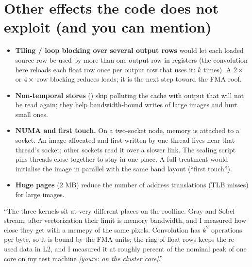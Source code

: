 \section{Other effects the code does not exploit (and you can mention)}

\begin{itemize}
\item \textbf{Tiling / loop blocking over several output rows} would let each loaded source row be used by more than one output row in registers (the convolution here reloads each float row once per output row that uses it: $k$ times). A $2\times$ or $4\times$ row blocking reduces loads; it is the next step toward the FMA roof.
\item \textbf{Non-temporal stores} () skip polluting the cache with output that will not be read again; they help bandwidth-bound writes of large images and hurt small ones.
\item \textbf{NUMA and first touch.} On a two-socket node, memory is attached to a socket. An image allocated and first written by one thread lives near that thread's socket; other sockets read it over a slower link. The scaling script pins threads close together to stay in one place. A full treatment would initialise the image in parallel with the same band layout (``first touch'').
\item \textbf{Huge pages} (2 MB) reduce the number of address translations (TLB misses) for large images.
\end{itemize}

\begin{sound}
``The three kernels sit at very different places on the roofline. Gray and Sobel stream: after vectorization their limit is memory bandwidth, and I measured how close they get with a memcpy of the same pixels. Convolution has $k^2$ operations per byte, so it is bound by the FMA units; the ring of float rows keeps the re-used data in L2, and I measured it at roughly \fracOfNominalPeak{} percent of the nominal peak of one core on my test machine \emph{[yours: on the cluster core]}.''
\end{sound}

